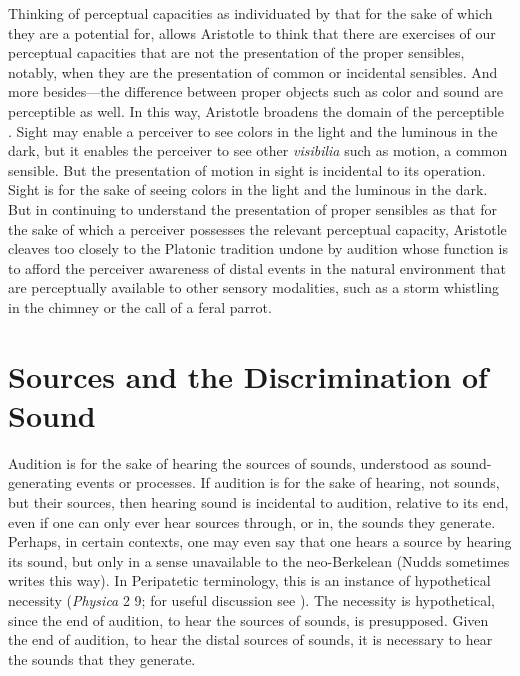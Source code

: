 Thinking of perceptual capacities as individuated by that for the sake of which they are a potential for, allows Aristotle to think that there are exercises of our perceptual capacities that are not the presentation of the proper sensibles, notably, when they are the presentation of common or incidental sensibles. And more besides---the difference between proper objects such as color and sound are perceptible as well. In this way, Aristotle broadens the domain of the perceptible \citep{Sorabji:1971fr,Sorabji:2003fk,Kalderon:2015fr}. Sight may enable a perceiver to see colors in the light and the luminous in the dark, but it enables the perceiver to see other \emph{visibilia} such as motion, a common sensible. But the presentation of motion in sight is incidental to its operation. Sight is for the sake of seeing colors in the light and the luminous in the dark. But in continuing to understand the presentation of proper sensibles as that for the sake of which a perceiver possesses the relevant perceptual capacity, Aristotle cleaves too closely to the Platonic tradition undone by audition whose function is to afford the perceiver awareness of distal events in the natural environment that are perceptually available to other sensory modalities, such as a storm whistling in the chimney or the call of a feral parrot.


\section{Sources and the Discrimination of Sound} %
\label{sec:sources_and_the_discrimination_of_sound}

Audition is for the sake of hearing the sources of sounds, understood as sound-generating events or processes. If audition is for the sake of hearing, not sounds, but their sources, then hearing sound is incidental to audition, relative to its end, even if one can only ever hear sources through, or in, the sounds they generate. Perhaps, in certain contexts, one may even say that one hears a source by hearing its sound, but only in a sense unavailable to the neo-Berkelean (Nudds sometimes writes this way). In Peripatetic terminology, this is an instance of hypothetical necessity (\emph{Physica} 2 9; for useful discussion see \citealt{Charles:1988as}). The necessity is hypothetical, since the end of audition, to hear the sources of sounds, is presupposed. Given the end of audition, to hear the distal sources of sounds, it is necessary to hear the sounds that they generate.

